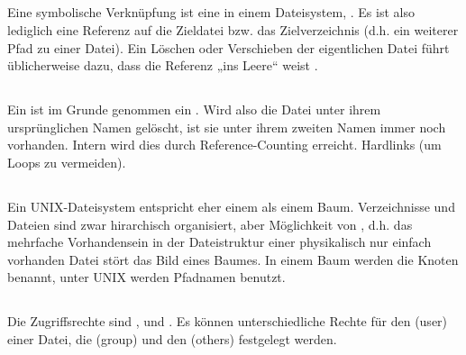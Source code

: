 \subsection{}
\begin{answer}
\paragraph*{}
Eine symbolische Verknüpfung ist eine  in einem Dateisystem, . Es ist also lediglich eine Referenz auf die Zieldatei bzw. das Zielverzeichnis (d.h. ein weiterer Pfad zu einer Datei). Ein Löschen oder Verschieben der eigentlichen Datei führt üblicherweise dazu, dass die Referenz „ins Leere“ weist .

\subsection{}
\paragraph*{}
Ein  ist im Grunde genommen ein . Wird also die Datei unter ihrem ursprünglichen Namen gelöscht, ist sie unter ihrem zweiten Namen immer noch vorhanden. Intern wird dies durch Reference-Counting erreicht. Hardlinks  (um Loops zu vermeiden).
\end{answer}

\subsection{}
\begin{answer}
Ein UNIX-Dateisystem entspricht eher einem  als einem Baum. Verzeichnisse und Dateien sind zwar hirarchisch organisiert, aber Möglichkeit von , d.h. das mehrfache Vorhandensein in der Dateistruktur einer physikalisch nur einfach vorhanden Datei stört das Bild eines Baumes. In einem Baum werden die Knoten benannt, unter UNIX werden Pfadnamen benutzt.
\end{answer}

\subsection{}
\begin{answer}
Die Zugriffsrechte sind ,  und .
Es können unterschiedliche Rechte für den  (user) einer Datei, die  (group) und den  (others) festgelegt werden.
\end{answer}

